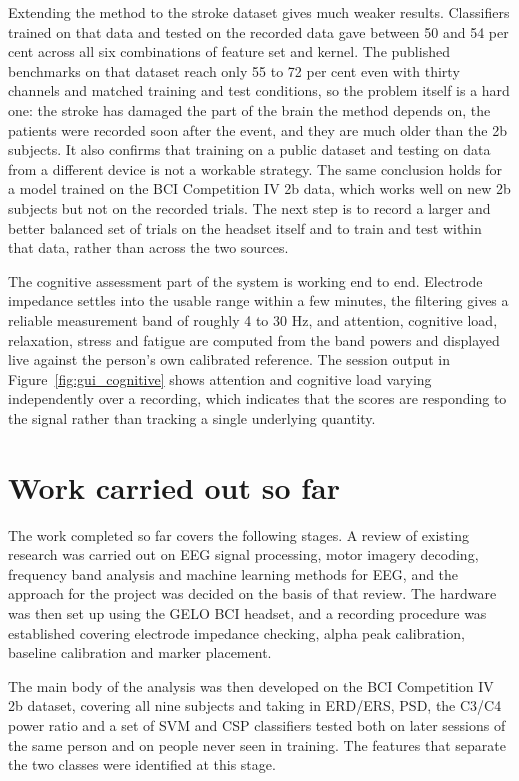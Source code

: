 Extending the method to the stroke dataset gives much weaker results. Classifiers trained
on that data and tested on the recorded data gave between 50 and 54 per cent across all
six combinations of feature set and kernel. The published benchmarks on that dataset reach
only 55 to 72 per cent even with thirty channels and matched training and test conditions,
so the problem itself is a hard one: the stroke has damaged the part of the brain the
method depends on, the patients were recorded soon after the event, and they are much
older than the 2b subjects. It also confirms that training on a public dataset and
testing on data from a different device is not a workable strategy. The same conclusion
holds for a model trained on the BCI Competition IV 2b data, which works well on new 2b
subjects but not on the recorded trials. The next step is to
record a larger and better balanced set of trials on the headset itself and to train and
test within that data, rather than across the two sources.

The cognitive assessment part of the system is working end to end. Electrode impedance
settles into the usable range within a few minutes, the filtering gives a reliable
measurement band of roughly 4 to 30 Hz, and attention, cognitive load, relaxation, stress
and fatigue are computed from the band powers and displayed live against the person's own
calibrated reference. The session output in Figure~\ref{fig:gui_cognitive} shows attention
and cognitive load varying independently over a recording, which indicates that the scores
are responding to the signal rather than tracking a single underlying quantity.

\section{Work carried out so far}

The work completed so far covers the following stages. A review of existing research was
carried out on EEG signal processing, motor imagery decoding, frequency band analysis and
machine learning methods for EEG, and the approach for the project was decided on the basis
of that review. The hardware was then set up using the GELO BCI headset, and a recording
procedure was established covering electrode impedance checking, alpha peak calibration,
baseline calibration and marker placement.

The main body of the analysis was then developed on the BCI Competition IV 2b dataset,
covering all nine subjects and taking in ERD/ERS, PSD, the C3/C4 power ratio and a set of
SVM and CSP classifiers tested both on later sessions of the same person and on people
never seen in training. The features that separate the two classes were identified at this
stage.

